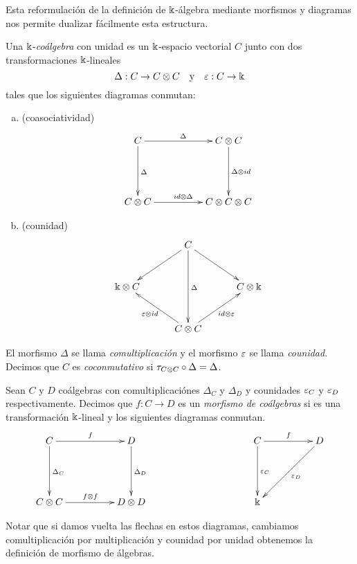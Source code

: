 \documentclass[a4paper,oneside,fleqn,11pt,../tesis.tex]{subfiles}
\begin{document}
Esta reformulación de la definición de $\Bbbk$-álgebra mediante morfismos y diagramas nos permite dualizar fácilmente esta estructura.

\begin{definition}\label{defcoalgebra}
	Una $\Bbbk$-\emph{coálgebra} con unidad es un $\Bbbk$-espacio vectorial $C$
	junto con dos transformaciones $\Bbbk$-lineales
	\[
		\Delta: C \to C \otimes C \quad\text{y}\quad \varepsilon: C \to \Bbbk
	\]
	tales que los siguientes diagramas conmutan:
	\begin{enumerate}[(a)]
		\item (coasociatividad)
		\begin{align*}
		\xymatrix@=5em{
			C \ar[r]^{\Delta} \ar[d]^{\Delta} & C \ox C \ar[d]^{\Delta \ox id}\\
			C \ox C \ar[r]^{id \ox \Delta} & C \ox C \ox C
		}
		\end{align*}
		\item (counidad)
		\begin{align*}
		\xymatrix@=3em{
			& C \ar[dd]^{\Delta} \ar[dl] \ar[dr] & \\
			\field \ox C  & & C \ox \field \\
			& C \ox C \ar[ul]^{\veps \ox id} \ar[ur]_{id \ox \veps} &
		}
		\end{align*}
	\end{enumerate}
	El morfismo $\Delta$ se llama \emph{comultiplicación} y el morfismo $\varepsilon$ se llama \emph{counidad}.
	Decimos que $C$ es \emph{coconmutativo} si $\tau_{C \otimes C} \circ \Delta = \Delta$.
\end{definition}

\begin{definition} \label{defmorfcoalegbras}
	Sean $C$ y $D$ coálgebras con comultiplicaciónes $\Delta_C$ y $\Delta_D$ y counidades $\varepsilon_C$ y $\varepsilon_D$ respectivamente.
	Decimos que $f:C \to D$ es un \emph{morfismo de coálgebras} si es una transformación $\Bbbk$-lineal y los siguientes diagramas
	conmutan.
	\begin{align*}
	\xymatrix@=5em{
		C \ar[r]^{f} \ar[d]^{\Delta_C} & D \ar[d]^{\Delta_D} && C \ar[r]^{f} \ar[d]^{\veps_C} & D \ar[dl]^{\veps_D} \\
		C \ox C \ar[r]^{f \ox f} & D\ox D && \field	
	}
	\end{align*}
\end{definition}
Notar que si damos vuelta las flechas en estos diagramas, cambiamos comultiplicación por multiplicación y counidad
por unidad obtenemos la definición de morfismo de álgebras.
\end{document}
